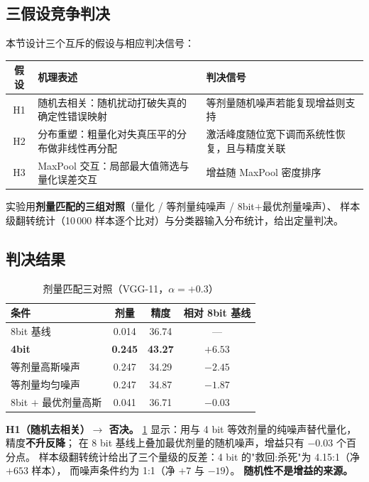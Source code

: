 \documentclass[11pt,a4paper]{ctexart}
\begin{document}
\subsection{三假设竞争判决}

本节设计三个互斥的假设与相应判决信号：

\begin{center}
\small
\begin{tabular}{clp{7.6cm}}
\toprule
假设 & 机理表述 & 判决信号 \\
\midrule
H1 & 随机去相关：随机扰动打破失真的确定性错误映射 & 等剂量随机噪声若能复现增益则支持 \\[2pt]
H2 & 分布重塑：粗量化对失真压平的分布做非线性再分配 & 激活峰度随位宽下调而系统性恢复，且与精度关联 \\[2pt]
H3 & MaxPool 交互：局部最大值筛选与量化误差交互 & 增益随 MaxPool 密度排序 \\
\bottomrule
\end{tabular}
\end{center}

实验用\textbf{剂量匹配的三组对照}（量化 / 等剂量纯噪声 / 8bit$+$最优剂量噪声）、
样本级翻转统计（10\,000 样本逐个比对）与分类器输入分布统计，给出定量判决。

\subsection{判决结果}

\begin{table}[t]
\centering
\caption{剂量匹配三对照（VGG-11，$\alpha=+0.3$）}
\label{tab:dose}
\small
\begin{tabular}{lccc}
\toprule
条件 & 剂量 & 精度 & 相对 8bit 基线 \\
\midrule
8bit 基线 & 0.014 & 36.74 & --- \\
\textbf{4bit} & \textbf{0.245} & \textbf{43.27} & $\mathbf{+6.53}$ \\
等剂量高斯噪声 & 0.247 & 34.29 & $-2.45$ \\
等剂量均匀噪声 & 0.247 & 34.87 & $-1.87$ \\
8bit $+$ 最优剂量高斯 & 0.041 & 36.71 & $-0.03$ \\
\bottomrule
\end{tabular}
\end{table}

\textbf{H1（随机去相关）$\to$ 否决。}
\cref{tab:dose} 显示：用与 4 bit 等效剂量的纯噪声替代量化，精度\textbf{不升反降}；
在 8 bit 基线上叠加最优剂量的随机噪声，增益只有 $-0.03$ 个百分点。
样本级翻转统计给出了三个量级的反差：4 bit 的"救回:杀死"为 4.15:1（净 $+653$ 样本），
而噪声条件约为 1:1（净 $+7$ 与 $-19$）。
\textbf{随机性不是增益的来源。}
\end{document}
